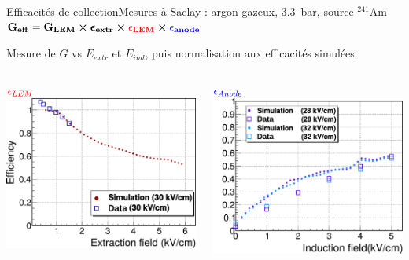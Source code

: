    \begin{frame}{Efficacités de collection}{Mesures à Saclay : argon gazeux, \SI{3.3}{\bar}, source $^{241}$Am}
        $\mathbf{G_{eff}=G_{LEM}\boldsymbol{\times}\boldsymbol{\epsilon}_{extr} \boldsymbol{\times}\textcolor{red}{\epsilon_{LEM}}\boldsymbol{\times} \textcolor{blue}{\epsilon_{anode}}}$\\\vspace{0.2cm}
        
        \begin{scriptsize}
         Mesure de $G$ vs $E_{extr}$ et $E_{ind}$, puis normalisation aux efficacités simulées.\\\vfill
        \begin{columns}
            \begin{column}{0.5\textwidth}
                \centering $\textcolor{red}{\epsilon_{LEM}}$
                \includegraphics[width=\textwidth]{./pictures/eff_lem_gamelle.pdf}
            \end{column}\hfill
            \begin{column}{0.5\textwidth}
                \centering $\textcolor{blue}{\epsilon_{Anode}}$
                \includegraphics[width=\textwidth]{./pictures/eff_anode_gamelle.pdf}

\end{column}
\end{columns}
\end{scriptsize}
\end{frame}
